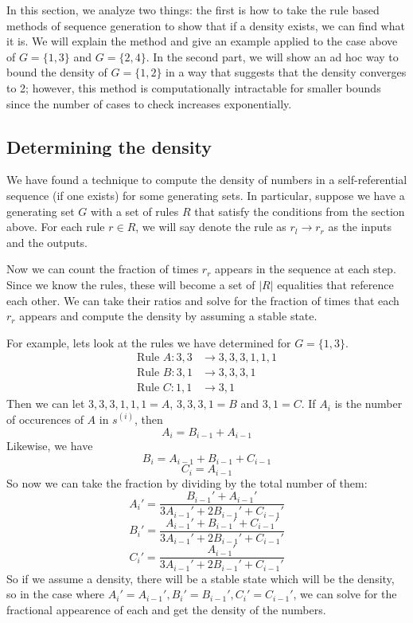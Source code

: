 \documentclass[runningheads,a4paper]{llncs}
\begin{document}
In this section, we analyze two things: the first is how to take the rule based methods of sequence generation to show that if a density exists, we can find what it is. We will explain the method and give an example applied to the case above of $G = \{ 1, 3\}$ and $G = \{ 2, 4 \}$. In the second part, we will show an ad hoc way to bound the density of $G = \{ 1, 2\}$ in a way that suggests that the density converges to 2; however, this method is computationally intractable for smaller bounds since the number of cases to check increases exponentially. 

\subsection{Determining the density}

We have found a technique to compute the density of numbers in a self-referential sequence (if one exists) for some generating sets. In particular, suppose we have a generating set $G$ with a set of rules $R$ that satisfy the conditions from the section above. For each rule $r \in R$, we will say denote the rule as $r_l \rightarrow r_r$ as the inputs and the outputs. 

Now we can count the fraction of times $r_r$ appears in the sequence at each step. Since we know the rules, these will become a set of $|R|$ equalities that reference each other. We can take their ratios and solve for the fraction of times that each $r_r$ appears and compute the density by assuming a stable state.

For example, lets look at the rules we have determined for $G = \{ 1, 3 \}$. 
\begin{align*}
\text{Rule }A: 3,3 &\to 3,3,3,1,1,1 \\
\text{Rule }B: 3,1 &\to 3,3,3,1\\
\text{Rule }C: 1,1 &\to 3,1
\end{align*}
Then we can let $3,3,3,1,1,1 = A$, $3,3,3,1 = B$ and $3, 1 = C$. If $A_i$ is the number of occurences of $A$ in $s^{(i)}$, then 
\[ A_i = B_{i-1} + A_{i-1} \]
Likewise, we have
\[ B_i = A_{i-1} + B_{i-1} + C_{i-1} \]
\[ C_i = A_{i-1} \]
So now we can take the fraction by dividing by the total number of them:
\[ A_i' = \dfrac{B_{i-1}' + A_{i-1}'}{3A_{i-1}' + 2B_{i-1}' + C_{i-1}'} \]
\[ B_i' = \dfrac{A_{i-1}' + B_{i-1}' + C_{i-1}'}{3A_{i-1}' + 2B_{i-1}' + C_{i-1}'} \]
\[ C_i' = \dfrac{A_{i-1}'}{3A_{i-1}' + 2B_{i-1}' + C_{i-1}'} \]
So if we assume a density, there will be a stable state which will be the density, so in the case where $A_i'=A_{i-1}', B_i' = B_{i-1}', C_i'=C_{i-1}'$, we can solve for the fractional appearence of each and get the density of the numbers.
\end{document}
